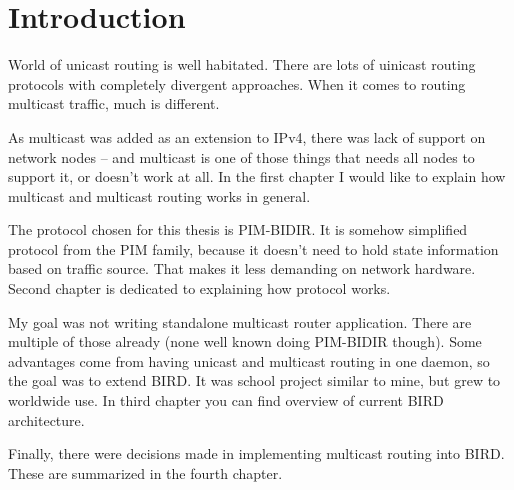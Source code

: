 \chapter*{Introduction}

World of unicast routing is well habitated. There are lots of uinicast routing
protocols with completely divergent approaches. When it comes to routing
multicast traffic, much is different.

As multicast was added as an extension to IPv4, there was lack of support on
network nodes -- and multicast is one of those things that needs all nodes to
support it, or doesn't work at all. In the first chapter I would like to %
explain how multicast and multicast routing works in general.

The protocol chosen for this thesis is PIM-BIDIR. It is somehow simplified
protocol from the PIM family, because it doesn't need to hold state information
based on traffic source. That makes it less demanding on network hardware.
Second chapter is dedicated to explaining how protocol works. %

My goal was not writing standalone multicast router application. There
are multiple of those already (none well known doing PIM-BIDIR though). Some
advantages come from having unicast and multicast routing in one daemon, so the
goal was to extend BIRD. It was school project similar to mine, but grew to
worldwide use. In third chapter you can find overview of current BIRD %
architecture.

Finally, there were decisions made in implementing multicast routing into BIRD.
These are summarized in the fourth chapter.


